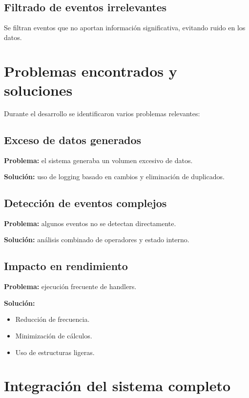 \subsection{Filtrado de eventos irrelevantes}

Se filtran eventos que no aportan información significativa, evitando ruido en los datos.

\section{Problemas encontrados y soluciones}

Durante el desarrollo se identificaron varios problemas relevantes:

\subsection{Exceso de datos generados}

\textbf{Problema:} el sistema generaba un volumen excesivo de datos.

\textbf{Solución:} uso de logging basado en cambios y eliminación de duplicados.

\subsection{Detección de eventos complejos}

\textbf{Problema:} algunos eventos no se detectan directamente.

\textbf{Solución:} análisis combinado de operadores y estado interno.

\subsection{Impacto en rendimiento}

\textbf{Problema:} ejecución frecuente de handlers.

\textbf{Solución:}
\begin{itemize}
    \item Reducción de frecuencia.
    \item Minimización de cálculos.
    \item Uso de estructuras ligeras.
\end{itemize}

\section{Integración del sistema completo}

